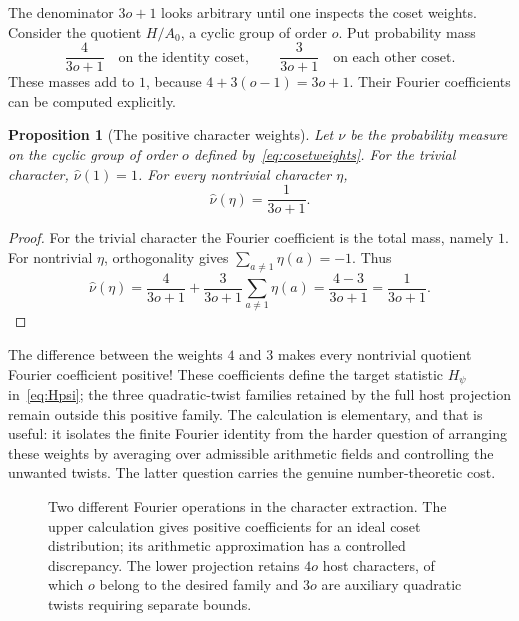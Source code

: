 \documentclass[11pt,openany,oneside]{scrbook}
\newtheorem{proposition}[theorem]{Proposition}
\theoremstyle{definition}
\theoremstyle{remark}
\begin{document}
The denominator $3o+1$ looks arbitrary until one inspects the coset weights. Consider the quotient $H/A_0$, a cyclic group of order $o$. Put probability mass
\begin{equation}\label{eq:cosetweights}
\frac4{3o+1}\quad\text{on the identity coset},
\qquad \frac3{3o+1}\quad\text{on each other coset}.
\end{equation}
These masses add to $1$, because $4+3(o-1)=3o+1$. Their Fourier coefficients can be computed explicitly.

\begin{proposition}[The positive character weights]\label{prop:weights}
Let $\nu$ be the probability measure on the cyclic group of order $o$ defined by~\eqref{eq:cosetweights}. For the trivial character, $\widehat\nu(1)=1$. For every nontrivial character $\eta$,
\begin{equation}\label{eq:positive-fourier}
\widehat\nu(\eta)=\frac1{3o+1}.
\end{equation}
\end{proposition}
\begin{proof}
For the trivial character the Fourier coefficient is the total mass, namely $1$. For nontrivial $\eta$, orthogonality gives $\sum_{a\ne 1}\eta(a)=-1$. Thus
\[
\widehat\nu(\eta)
=\frac4{3o+1}+\frac3{3o+1}\sum_{a\ne1}\eta(a)
=\frac{4-3}{3o+1}=\frac1{3o+1}.
\]
\end{proof}

The difference between the weights $4$ and $3$ makes every nontrivial quotient Fourier coefficient positive! These coefficients define the target statistic $H_\psi$ in~\eqref{eq:Hpsi}; the three quadratic-twist families retained by the full host projection remain outside this positive family. The calculation is elementary, and that is useful: it isolates the finite Fourier identity from the harder question of arranging these weights by averaging over admissible arithmetic fields and controlling the unwanted twists. The latter question carries the genuine number-theoretic cost.

\begin{figure}[H]
\centering

\caption{Two different Fourier operations in the character extraction. The upper calculation gives positive coefficients for an ideal coset distribution; its arithmetic approximation has a controlled discrepancy. The lower projection retains $4o$ host characters, of which $o$ belong to the desired family and $3o$ are auxiliary quadratic twists requiring separate bounds.}
\label{fig:v108-fourier-projection}
\end{figure}
\end{document}

